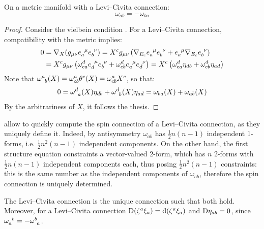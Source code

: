 \begin{proposition}{}{}
  On a metric manifold with a Levi--Civita connection:
  \begin{equation}
    \omega_{ab} = -\omega_{ba}
    \label{eq:connection-form-symm}
  \end{equation}
\end{proposition}

\begin{proofbox}
  \begin{proof}
    Consider the vielbein condition . For a Levi--Civita connection, compatibility with the metric implies:
    \begin{equation*}
      \begin{split}
        0
        & = \na_X (g_{\mu \nu} \tensor{e}{_a^\mu} \tensor{e}{_b^\nu}) = X^c g_{\mu \nu} \left( \na_{E_c} \tensor{e}{_a^\mu} \tensor{e}{_b^\nu} + \tensor{e}{_a^\mu} \na_{E_c} \tensor{e}{_b^\nu} \right) \\
        & = X^c g_{\mu \nu} \left( \omega^d_{ca} \tensor{e}{_d^\mu} \tensor{e}{_b^\nu} + \omega^d_{cb} \tensor{e}{_a^\mu} \tensor{e}{_d^\nu} \right) = X^c \left( \omega^d_{ca} \eta_{db} + \omega^d_{cb} \eta_{ad} \right)
      \end{split}
    \end{equation*}
    Note that $ \tensor{\omega}{^a_b}(X) = \omega^a_{cb} \theta^c(X) = \omega^a_{cb} X^c $, so that:
    \begin{equation*}
      0 = \tensor{\omega}{^d_a}(X) \eta_{db} + \tensor{\omega}{^d_b}(X) \eta_{ad} = \omega_{ba}(X) + \omega_{ab}(X)
    \end{equation*}
    By the arbitrariness of $ X $, it follows the thesis.
  \end{proof}
\end{proofbox}

 allow to quickly compute the spin connection of a Levi--Civita connection, as they uniquely define it. Indeed, by antisymmetry $ \omega_{ab} $ has $ \frac{1}{2} n (n-1) $ independent 1-forms, i.e. $ \frac{1}{2} n^2 (n-1) $ independent components. On the other hand, the first structure equation constraints a vector-valued 2-form, which has $ n $ 2-forms with $ \frac{1}{2} n (n-1) $ independent components each, thus posing $ \frac{1}{2} n^2 (n-1) $ constraints: this is the same number as the independent components of $ \omega_{ab} $, therefore the spin connection is uniquely determined.

The Levi--Civita connection is the unique connection such that  both hold. Moreover, for a Levi--Civita connection $ \mathrm{D} (\zeta^a \xi_a) = \mathrm{d} (\zeta^a \xi_a) $ and $ \mathrm{D} \eta_{ab} = 0 $, since $ \tensor{\omega}{_a^b} = - \tensor{\omega}{^b_a} $.

